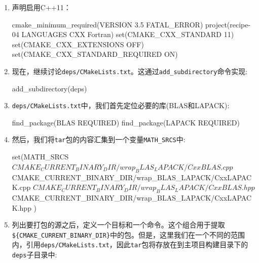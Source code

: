 \begin{enumerate}
\item 声明启用C++11：

\begin{codebox}[cmake]
cmake_minimum_required(VERSION 3.5 FATAL_ERROR)
project(recipe-04 LANGUAGES CXX Fortran)
set(CMAKE_CXX_STANDARD 11)
set(CMAKE_CXX_EXTENSIONS OFF)
set(CMAKE_CXX_STANDARD_REQUIRED ON)
\end{codebox}

\item 现在，继续讨论\texttt{deps/CMakeLists.txt}。这通过\texttt{add\_subdirectory}命令实现:

\begin{codebox}[cmake]
add_subdirectory(deps)
\end{codebox}

\item \texttt{deps/CMakeLists.txt}中，我们首先定位必要的库(BLAS和LAPACK):

\begin{codebox}[cmake]
find_package(BLAS REQUIRED)
find_package(LAPACK REQUIRED)
\end{codebox}

\item 然后，我们将\texttt{tar}包的内容汇集到一个变量\texttt{MATH\_SRCS}中:

\begin{codebox}[cmake]
set(MATH_SRCS
  ${CMAKE_CURRENT_BINARY_DIR}/wrap_BLAS_LAPACK/CxxBLAS.cpp
  ${CMAKE_CURRENT_BINARY_DIR}/wrap_BLAS_LAPACK/CxxLAPACK.cpp
  ${CMAKE_CURRENT_BINARY_DIR}/wrap_BLAS_LAPACK/CxxBLAS.hpp
  ${CMAKE_CURRENT_BINARY_DIR}/wrap_BLAS_LAPACK/CxxLAPACK.hpp
  )
\end{codebox}

\item 列出要打包的源之后，定义一个目标和一个命令。这个组合用于提取\texttt{\$\{CMAKE\_CURRENT\_BINARY\_DIR\}}中的包。但是，这里我们在一个不同的范围内，引用\texttt{deps/CMakeLists.txt}，因此\texttt{tar}包将存放在到主项目构建目录下的\texttt{deps}子目录中:



\end{enumerate}

